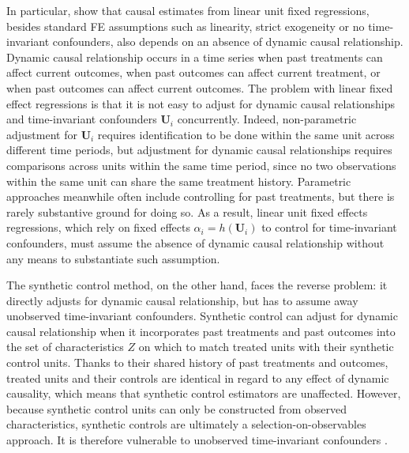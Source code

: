 \documentclass[12pt]{article}\usepackage[]{graphicx}\usepackage[]{color}
\newcommand{\1}{\mathbbm{1}}
\begin{document}
In particular, \cite{ImaiKim2012} show that causal estimates from linear unit fixed regressions, besides standard FE assumptions such as linearity, strict exogeneity or no time-invariant confounders, also depends on an absence of dynamic causal relationship. Dynamic causal relationship occurs in a time series when past treatments can affect current outcomes, when past outcomes can affect current treatment, or when past outcomes can affect current outcomes. The problem with linear fixed effect regressions is that it is not easy to adjust for dynamic causal relationships and time-invariant confounders $\mathbf{U}_i$ concurrently. Indeed, non-parametric adjustment for $\mathbf{U}_i$ requires identification to be done within the same unit across different time periods, but adjustment for dynamic causal relationships requires comparisons across units within the same time period, since no two observations within the same unit can share the same treatment history. Parametric approaches meanwhile often include controlling for past treatments, but there is rarely substantive ground for doing so. As a result, linear unit fixed effects regressions, which rely on fixed effects $\alpha_i = h(\mathbf{U}_i)$ to control for time-invariant confounders, must assume the absence of dynamic causal relationship without any means to substantiate such assumption.

The synthetic control method, on the other hand, faces the reverse problem: it directly adjusts for dynamic causal relationship, but has to assume away unobserved time-invariant confounders. Synthetic control can adjust for dynamic causal relationship when it incorporates past treatments and past outcomes into the set of characteristics $Z$ on which to match treated units with their synthetic control units. Thanks to their shared history of past treatments and outcomes, treated units and their controls are identical in regard to any effect of dynamic causality, which means that synthetic control estimators are unaffected. However, because synthetic control units can only be constructed from observed characteristics, synthetic controls are ultimately a selection-on-observables approach. It is therefore vulnerable to unobserved time-invariant confounders \citep{ImaiKim2012}. 
\end{document}
